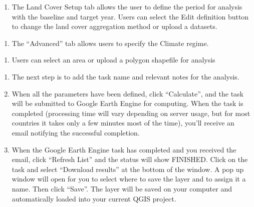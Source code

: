 \documentclass[letterpaper,10pt,english]{sphinxmanual}
\begin{document}
\begin{enumerate}
%
\setcounter{enumi}{1}
\item {} 
\sphinxAtStartPar
The Land Cover Setup tab allows the user to define the period for analysis
with the baseline and target year. Users can select the Edit definition
button to change the land cover aggregation method or upload a datasets.

\end{enumerate}

\begin{enumerate}
%
\setcounter{enumi}{2}
\item {} 
\sphinxAtStartPar
The “Advanced” tab allows users to specify the Climate regime.

\end{enumerate}

\begin{enumerate}
%
\setcounter{enumi}{3}
\item {} 
\sphinxAtStartPar
Users can select an area or upload a polygon shapefile for analysis

\end{enumerate}

\begin{enumerate}
%
\setcounter{enumi}{5}
\item {} 
\sphinxAtStartPar
The next step is to add the task name and relevant notes for the analysis.

\item {} 
\sphinxAtStartPar
When all the parameters have been defined, click “Calculate”, and the task
will be submitted to Google Earth Engine for computing. When the task is
completed (processing time will vary depending on server usage, but for most
countries it takes only a few minutes most of the time), you’ll receive an
email notifying the successful completion.

\item {} 
\sphinxAtStartPar
When the Google Earth Engine task has completed and you received the email,
click “Refresh List” and the status will show FINISHED. Click on the task
and select “Download results” at the bottom of the window. A pop up window
will open for you to select where to save the layer and to assign it a name.
Then click “Save”. The layer will be saved on your computer and
automatically loaded into your current QGIS project.

\end{enumerate}
\end{document}

